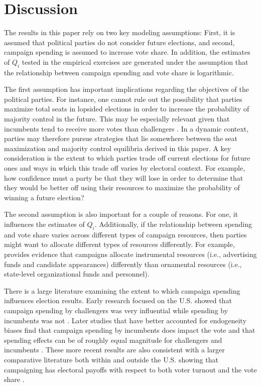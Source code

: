 \documentclass[12pt,final,fleqn]{article}
\theoremstyle{plain}
\begin{document}
\section{Discussion} \label{sec:discussion}
The results in this paper rely on two key modeling assumptions: First, it is assumed that political parties do not consider future elections, and second, campaign spending is assumed to increase vote share. In addition, the estimates of $Q_i$ tested in the empirical exercises are generated under the assumption that the relationship between campaign spending and vote share is logarithmic.

The first assumption has important implications regarding the objectives of the political parties. For instance, one cannot rule out the possibility that parties maximize total seats in lopsided elections in order to increase the probability of majority control in the future. This may be especially relevant given that incumbents tend to receive more votes than challengers \citep{ansolabehere2002incumbency,gelman1990estimating, gelman2008estimating, lee2001electoral}.  In a dynamic context, parties may therefore pursue strategies that lie somewhere between the seat maximization and majority control equilibria derived in this paper. A key consideration is the extent to which parties trade off current elections for future ones and ways in which this trade off varies by electoral context. For example, how confidence must a party be that they will lose in order to determine that they would be better off using their resources to maximize the probability of winning a future election?

The second assumption is also important for a couple of reasons. For one, it influences the estimates of $Q_i$. Additionally, if the relationship between spending and vote share varies across different types of campaign resources, then parties might want to allocate different types of resources differently. For example, \citet{bartels1985resource} provides evidence that campaigns allocate instrumental resources (i.e., advertising funds and candidate appearances) differently than ornamental resources (i.e., state-level organizational funds and personnel).  

There is a large literature examining the extent to which campaign spending influences election results. Early research focused on the U.S. showed that campaign spending by challengers was very influential while spending by incumbents was not \citep{jacobson1978effects, jacobson1980money,jacobson1985money}. Later studies that have better accounted for endogeneity biases find that campaign spending by incumbents does impact the vote and that spending effects can be of roughly equal magnitude for challengers and incumbents \citep{erikson2000equilibria, gerber1998estimating, green1988salvation}. These more recent results are also consistent with a larger comparative literature both within and outside the U.S. showing that campaigning has electoral payoffs with respect to both voter turnout and the vote share \citep[e.g.,][]{denver2003constituency, gerber2000effects, hillygus2005campaign, pattie1995winning,marsh2004none, whiteley2003win}. 
\end{document}
